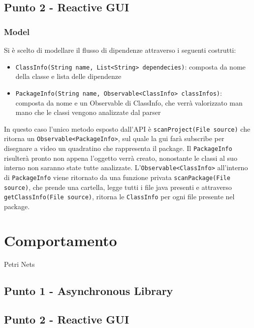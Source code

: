 \documentclass[a4paper,12pt]{report}
\begin{document}
    \section{Punto 2 - Reactive GUI}
    \subsection{Model}
    Si è scelto di modellare il flusso di dipendenze attraverso i seguenti costrutti:
    \begin{itemize}
        \item\texttt{ClassInfo(String name, List<String> dependecies)}: composta da nome della classe e lista delle dipendenze
        \item\texttt{PackageInfo(String name, Observable<ClassInfo> classInfos)}: composta da nome e un Observable di ClassInfo,
                    che verrà valorizzato man mano che le classi vengono analizzate dal parser
    \end{itemize}
    In questo caso l'unico metodo esposto dall'API è \texttt{scanProject(File source)} che ritorna un
    \texttt{Observable<PackageInfo>}, sul quale la gui farà subscribe per disegnare a video un quadratino
    che rappresenta il package. Il \texttt{PackageInfo} risulterà pronto non appena l'oggetto verrà creato,
    nonostante le classi al suo interno non saranno state tutte analizzate.
    L'\texttt{Observable<ClassInfo>} all'interno di \texttt{PackageInfo} viene ritornato da una funzione privata
    \texttt{scanPackage(File source)}, che prende una cartella, legge tutti i file java presenti e attraverso
    \texttt{getClassInfo(File source)}, ritorna le \texttt{ClassInfo} per ogni file presente nel package.


    \chapter{Comportamento}
    Petri Nets
    \section{Punto 1 - Asynchronous Library}
    \section{Punto 2 - Reactive GUI}
\end{document}
